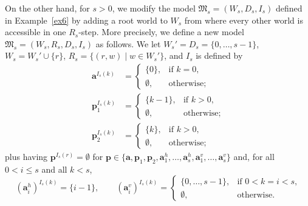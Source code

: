 \documentclass{lmcs} %
\theoremstyle{plain}\newtheorem{satz}[thm]{Satz} %
\newcommand{\fform}[1]{\boldsymbol{#1}}
\newcommand{\pvar}{\fform{p}}
\newcommand{\avar}{\fform{a}}
\begin{document}
\begin{exa}
	
	On the other hand, for $s>0$, 
	we modify the model $\mathfrak{M}_s=(W_s,D_s,I_s)$ defined in Example~\ref{ex6}
	by adding a root world to $W_s$ from where every other world is accessible in one $R_s$-step.
	More precisely, we define a new model $\mathfrak{M}_s=(W_s,R_s,D_s,I_s)$ as follows.
	We let $W_s'=D_s=\{0,\dots,s-1\}$, $W_s=W_s'\cup \{r\}$, $R_s=\{(r,w)\mid w\in W_s'\}$, and $I_s$ is defined
	by 
	\begin{align}
		\label{uiep1}
		\avar^{I_s(k)} & = \left\{
		\begin{array}{ll}
			\{0\},  & \mbox{if $k=0$,}\\[3pt]
			\emptyset, &\mbox{otherwise};
		\end{array}
		\right.
		\\
		\pvar_{1}^{I_{s}(k)}  & = \left\{
		\begin{array}{ll}
			\{k-1\},  & \mbox{if $k>0$,}\\[3pt]
			\emptyset, &\mbox{otherwise};
		\end{array}
		\right.
		\\
		\label{uiep3}   
		\pvar_{2}^{I_{s}(k)}  & = \left\{
		\begin{array}{ll}
			\{k\},  & \mbox{if $k>0$,}\\[3pt]
			\emptyset, &\mbox{otherwise};
		\end{array}
		\right.
	\end{align}
	plus having $\pvar^{I_s(r)}=\emptyset$ for 
	$\pvar\in\{\avar,\pvar_1,\pvar_2,\avar_1^h,\dots,\avar_s^h,\avar_1^v,\dots,\avar_s^v\}$ and, for all 
	$0<i\le s$ and all $k<s$,
%
\[
				(\avar_{i}^h)^{I_{s}(k)}   = \{i-1\},
		\qquad
		(\avar_{i}^v)^{I_{s}(k)}   = \left\{
		\begin{array}{ll}
			\{0,\ldots,s-1\},  & \mbox{if $0<k=i<s$,}\\[3pt]
			\emptyset, &\mbox{otherwise.}
		\end{array}
\]
\end{exa}
\end{document}
